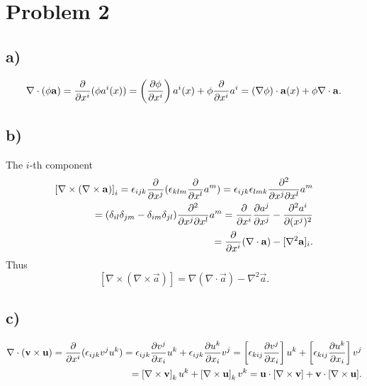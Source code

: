 \documentclass[10pt]{article}
\begin{document}
    
    \section{Problem 2}
    \subsection*{a)}
    \begin{displaymath}
      \nabla \cdot (\phi \mathbf{a}) = \frac{\partial }{\partial x^i}(\phi a^i(x)) 
      = \left(\frac{\partial \phi}{\partial x^i}\right) a^i(x) + \phi \frac{\partial }{\partial x^i} a^i 
      = \left(\nabla \phi\right) \cdot \mathbf{a}(x) + \phi \nabla \cdot \mathbf{a}.
    \end{displaymath}
    
    \subsection*{b)}
    The $i$-th component
    \begin{align*}
      \left[\nabla \times (\nabla \times \mathbf{a}) \right]_i =  \epsilon_{ijk} \frac{\partial }{\partial x^j} ( \mathbf{\epsilon}_{klm} \frac{\partial }{\partial x^l} a^m ) =  
       \epsilon_{ijk}\epsilon_{lmk} \frac{\partial^2}{\partial x^j \partial x^l} a^m\\
       = (\delta_{il} \delta_{jm} - \delta_{im} \delta_{jl}) \frac{\partial^2}{\partial x^j \partial x^l} a^m
       =  \frac{\partial }{\partial x^i}\frac{\partial a^j}{\partial x^j} - \frac{\partial^2 a^i}{\partial (x^j) ^ 2} \\
       = \frac{\partial }{\partial x^i} (\nabla \cdot \mathbf{a}) - [\nabla^2 \mathbf{a}]_i.
    \end{align*}
    Thus 
    \begin{displaymath}
      \left[ \nabla \times ( \nabla \times \vec a) \right] = \nabla(\nabla \cdot \vec a) - \nabla^2 \vec a.
    \end{displaymath}
    

    \subsection*{c)}
    \begin{align*}
      \nabla \cdot (\mathbf{v} \times \mathbf{u}) = \frac{\partial }{\partial x^i} (\epsilon_{ijk} v^j u^k) 
      = \epsilon_{ijk} \frac{\partial v^j}{\partial x_i} u^k + \epsilon_{ijk} \frac{\partial u^k}{\partial x_i} v^j
      = \left[ \epsilon_{kij} \frac{\partial v^j}{\partial x_i} \right] u^k + \left[ \epsilon_{kij} \frac{\partial u^k}{\partial x_i} \right]v^j \\
      = \left[ \nabla\times \mathbf{v} \right]_k u^k + \left[ \nabla \times \mathbf{u} \right]_k v^k 
      = \mathbf{u} \cdot [\nabla \times \mathbf{v}] + \mathbf{v} \cdot [\nabla \times \mathbf{u}].
    \end{align*}
\end{document}
